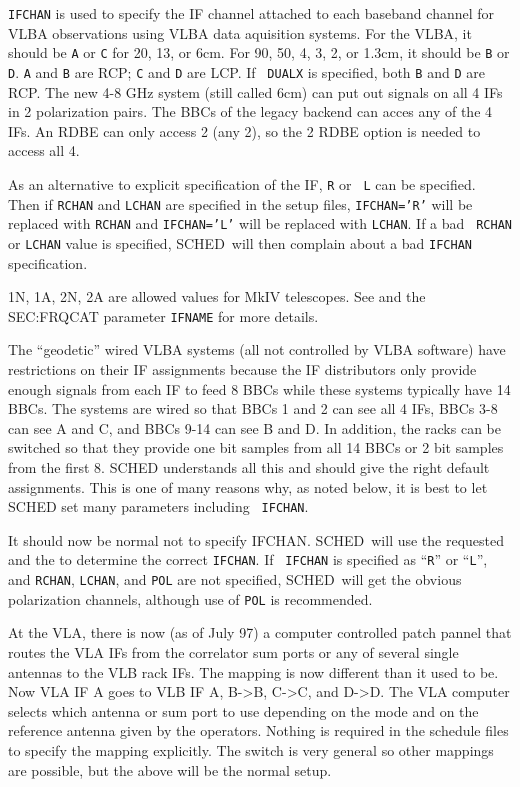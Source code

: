\documentclass{report}
\newcommand{\schedb}{{\sc SCHED~}}
\begin{document}
{\tt IFCHAN} is used to specify the IF channel attached to each
baseband channel for VLBA observations using VLBA data aquisition
systems.  For the VLBA, it should be {\tt A} or {\tt C} for 20, 13, or
6cm.  For 90, 50, 4, 3, 2, or 1.3cm, it should be {\tt B} or {\tt D}.
{\tt A} and {\tt B} are RCP; {\tt C} and {\tt D} are LCP. If {\tt
DUALX} is specified, both {\tt B} and {\tt D} are RCP. The new 4-8 GHz
system (still called 6cm) can put out signals on all 4 IFs in 2
polarization pairs.  The BBCs of the legacy backend can acces any
of the 4 IFs.  An RDBE can only access 2 (any 2), so the 2 RDBE
option is needed to access all 4.  

As an alternative to explicit specification of the IF, {\tt R} or {\tt
L} can be specified. Then if {\tt RCHAN} and {\tt LCHAN} are specified
in the setup files, {\tt IFCHAN='R'} will be replaced with {\tt RCHAN}
and {\tt IFCHAN='L'} will be replaced with {\tt LCHAN}.  If a bad {\tt
RCHAN} or {\tt LCHAN} value is specified, \schedb will then complain
about a bad {\tt IFCHAN} specification.

1N, 1A, 2N, 2A are allowed values for MkIV telescopes.
See  and the 
{SEC:FRQCAT} parameter {\tt IFNAME} for more details.

The ``geodetic'' wired VLBA systems (all not controlled by VLBA
software) have restrictions on their IF assignments because the IF
distributors only provide enough signals from each IF to feed 8 BBCs
while these systems typically have 14 BBCs.  The systems are wired so
that BBCs 1 and 2 can see all 4 IFs, BBCs 3-8 can see A and C, and
BBCs 9-14 can see B and D.  In addition, the racks can be switched so
that they provide one bit samples from all 14 BBCs or 2 bit samples
from the first 8.  SCHED understands all this and should give the
right default assignments.  This is one of many reasons why, as noted
below, it is best to let SCHED set many parameters including {\tt
IFCHAN}.

It should now be normal not to specify IFCHAN.  \schedb will use the
requested  and the  to determine the correct {\tt IFCHAN}.  If {\tt
IFCHAN} is specified as ``{\tt R}'' or ``{\tt L}'', and {\tt RCHAN},
{\tt LCHAN}, and {\tt POL} are not specified, \schedb will get the
obvious polarization channels, although use of {\tt POL} is
recommended.

At the VLA, there is now (as of July 97) a computer controlled patch
pannel that routes the VLA IFs from the correlator sum ports or any
of several single antennas to the VLB rack IFs.  The mapping is now
different than it used to be.  Now VLA IF A goes to VLB IF A, B->B,
C->C, and D->D.  The VLA computer selects which antenna or sum port
to use depending on the mode and on the reference antenna given by
the operators.  Nothing is required in the schedule files to specify
the mapping explicitly.  The switch is very general so other mappings
are possible, but the above will be the normal setup.
\end{document}
